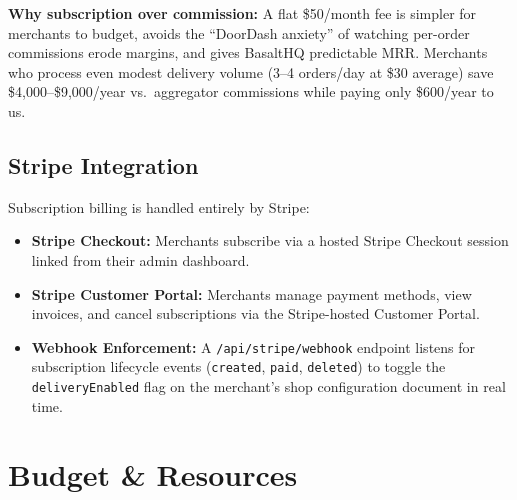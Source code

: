 \documentclass[11pt, letterpaper]{article}
\begin{document}
\begin{insightbox}
\textbf{Why subscription over commission:} A flat \$50/month fee is simpler for merchants to budget, avoids the ``DoorDash anxiety'' of watching per-order commissions erode margins, and gives BasaltHQ predictable MRR. Merchants who process even modest delivery volume (3--4 orders/day at \$30 average) save \$4,000--\$9,000/year vs.\ aggregator commissions while paying only \$600/year to us.
\end{insightbox}

\subsection{Stripe Integration}
Subscription billing is handled entirely by Stripe:
\begin{itemize}
    \item \textbf{Stripe Checkout:} Merchants subscribe via a hosted Stripe Checkout session linked from their admin dashboard.
    \item \textbf{Stripe Customer Portal:} Merchants manage payment methods, view invoices, and cancel subscriptions via the Stripe-hosted Customer Portal.
    \item \textbf{Webhook Enforcement:} A \texttt{/api/stripe/webhook} endpoint listens for subscription lifecycle events (\texttt{created}, \texttt{paid}, \texttt{deleted}) to toggle the \texttt{deliveryEnabled} flag on the merchant's shop configuration document in real time.
\end{itemize}

\section{Budget \& Resources}
\end{document}
